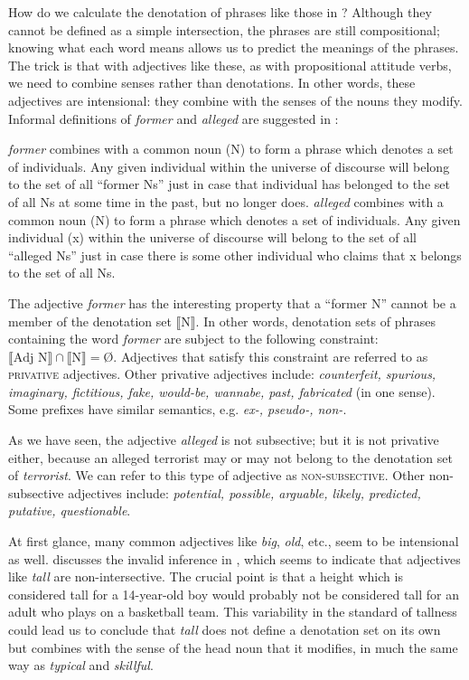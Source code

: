 How do we calculate the denotation of phrases like those in ? Although they cannot be defined as a simple intersection, the phrases are still compositional; knowing what each word means allows us to predict the meanings of the phrases. The trick is that with adjectives like these, as with propositional attitude verbs, we need to combine senses rather than denotations. In other words, these adjectives are intensional: they combine with the senses of the nouns they modify. Informal definitions of \textit{former} and \textit{alleged} are suggested in :\largerpage


\eanoraggedright \label{ex:15.11}
\eanoraggedright   \textit{former} combines with a common noun (N) to form a phrase which denotes a set of individuals. Any given individual within the universe of discourse will belong to the set of all “former Ns” just in case that individual has belonged to the set of all Ns at some time in the past, but no longer does.
\ex  \textit{alleged} combines with a common noun (N) to form a phrase which denotes a set of individuals. Any given individual (x) within the universe of discourse will belong to the set of all “alleged Ns” just in case there is some other individual who claims that x belongs to the set of all Ns.
\z \z


The adjective \textit{former} has the interesting property that a “former N” cannot be a member of the denotation set $\llbracket$N$\rrbracket$. In other words, denotation sets of phrases containing the word \textit{former} are subject to the following constraint: $\llbracket \text{Adj~N}\rrbracket \cap \llbracket \text{N} \rrbracket  =$Ø. Adjectives that satisfy this constraint are referred to as \textsc{privative} adjectives. Other privative adjectives include: \textit{counterfeit, spurious, imaginary, fictitious, fake, would-be, wannabe, past, fabricated} (in one sense). Some prefixes have similar semantics, e.g. \textit{ex-, pseudo-, non-}.



As we have seen, the adjective \textit{alleged} is not subsective; but it is not privative either, because an alleged terrorist may or may not belong to the denotation set of \textit{terrorist}. We can refer to this type of adjective as \textsc{non-subsective}. Other non-subsective adjectives include: \textit{potential, possible, arguable, likely, predicted, putative, questionable}.



At first glance, many common adjectives like \textit{big}, \textit{old}, etc., seem to be intensional as well. \citet{Partee1995} discusses the invalid inference in , which seems to indicate that adjectives like \textit{tall} are non-intersective. The crucial point is that a height which is considered tall for a 14-year-old boy would probably not be considered tall for an adult who plays on a basketball team. This variability in the standard of tallness could lead us to conclude that \textit{tall} does not define a denotation set on its own but combines with the sense of the head noun that it modifies, in much the same way as \textit{typical} and \textit{skillful}.


